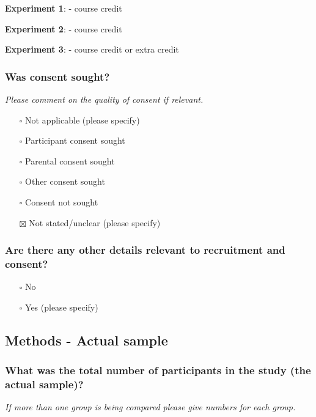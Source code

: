 \documentclass[
  doc, a4paper]{apa7}
\providecommand{\tightlist}{%
  \setlength{\itemsep}{0pt}\setlength{\parskip}{0pt}}
\begin{document}
\textbf{Experiment 1}:
- course credit

\textbf{Experiment 2}:
- course credit

\textbf{Experiment 3}:
- course credit or extra credit

\subsubsection{Was consent sought?}\label{was-consent-sought}

\emph{Please comment on the quality of consent if relevant.}

\begin{itemize}
\tightlist
\item[$\square$]
  Not applicable (please specify)
\item[$\square$]
  Participant consent sought
\item[$\square$]
  Parental consent sought
\item[$\square$]
  Other consent sought
\item[$\square$]
  Consent not sought
\item[$\boxtimes$]
  Not stated/unclear (please specify)
\end{itemize}

\subsubsection{Are there any other details relevant to recruitment and consent?}\label{are-there-any-other-details-relevant-to-recruitment-and-consent}

\begin{itemize}
\tightlist
\item[$\square$]
  No
\item[$\square$]
  Yes (please specify)
\end{itemize}

\subsection{Methods - Actual sample}\label{methods---actual-sample}

\subsubsection{What was the total number of participants in the study (the actual sample)?}\label{what-was-the-total-number-of-participants-in-the-study-the-actual-sample}

\emph{If more than one group is being compared please give numbers for each group.}
\end{document}
